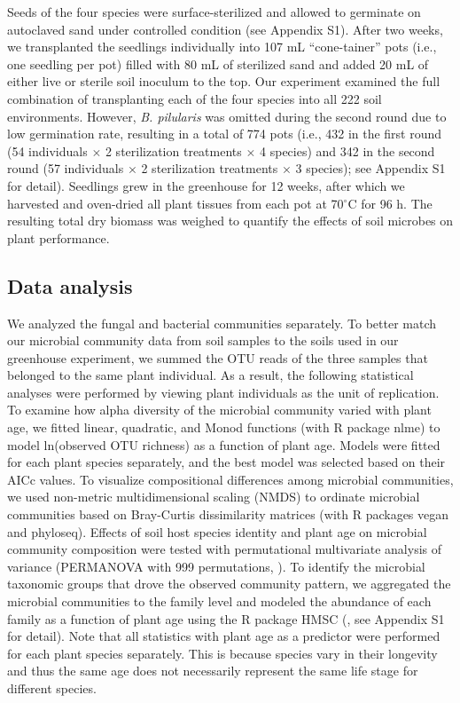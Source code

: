 Seeds of the four species were surface-sterilized and allowed to germinate on autoclaved sand under controlled condition (see Appendix S1). After two weeks, we transplanted the seedlings individually into 107 mL ``cone-tainer'' pots (i.e., one seedling per pot) filled with 80 mL of sterilized sand and added 20 mL of either live or sterile soil inoculum to the top. 
Our experiment examined the full combination of transplanting each of the four species into all 222 soil environments. However, \textit{B. pilularis} was omitted during the second round due to low germination rate, resulting in a total of 774 pots (i.e., 432 in the first round (54 individuals $\times$ 2 sterilization treatments $\times$ 4 species) and 342 in the second round (57 individuals $\times$ 2 sterilization treatments $\times$ 3 species); see Appendix S1 for detail).
Seedlings grew in the greenhouse for 12 weeks, after which we harvested and oven-dried all plant tissues from each pot at 70$^{\circ}$C for 96 h. The resulting total dry biomass was weighed to quantify the effects of soil microbes on plant performance.
\par



\subsection*{Data analysis}
We analyzed the fungal and bacterial communities separately. To better match our microbial community data from soil samples to the soils used in our greenhouse experiment, we summed the OTU reads of the three samples that belonged to the same plant individual. As a result, the following statistical analyses were performed by viewing plant individuals as the unit of replication. 
To examine how alpha diversity of the microbial community varied with plant age, we fitted linear, quadratic, and Monod functions (with R package nlme) to model ln(observed OTU richness) as a function of plant age. Models were fitted for each plant species separately, and the best model was selected based on their AICc values.
To visualize compositional differences among microbial communities, we used non-metric multidimensional scaling (NMDS) to ordinate microbial communities based on Bray-Curtis dissimilarity matrices (with R packages vegan and phyloseq). Effects of soil host species identity and plant age on microbial community composition were tested with permutational multivariate analysis of variance (PERMANOVA with 999 permutations, \citealp{Anderson2011}). 
To identify the microbial taxonomic groups that drove the observed community pattern, we aggregated the microbial communities to the family level and modeled the abundance of each family as a function of plant age using the R package HMSC (\citealp{Ovaskainen2017}, see Appendix S1 for detail). 
Note that all statistics with plant age as a predictor were performed for each plant species separately. This is because species vary in their longevity and thus the same age does not necessarily represent the same life stage for different species.
\par


